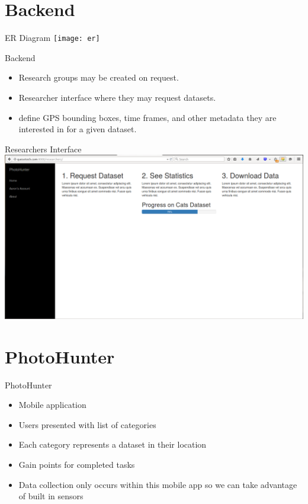 \documentclass[aspectratio=169]{beamer}
\begin{document}
\section{Backend}

\begin{frame}{ER Diagram}
  \centering
  \texttt{[image: er]}
\end{frame}

\begin{frame}{Backend}
  \begin{itemize}
    \item Research groups may be created on request.

    \item Researcher interface where they may request datasets.

    \item define GPS bounding boxes, time frames, and other metadata they are
      interested in for a given dataset.
  \end{itemize}
\end{frame}

\begin{frame}{Researchers Interface}
  \centering
  \includegraphics[width=\textwidth,height=\textheight,keepaspectratio]{researchers}
\end{frame}

\section{PhotoHunter}

\begin{frame}{PhotoHunter}
  \begin{itemize}

    \item Mobile application

    \item Users presented with list of categories

    \item Each category represents a dataset in their location

    \item Gain points for completed tasks

    \item Data collection only occurs within this mobile app so
          we can take advantage of built in sensors

  \end{itemize}
\end{frame}
\end{document}
